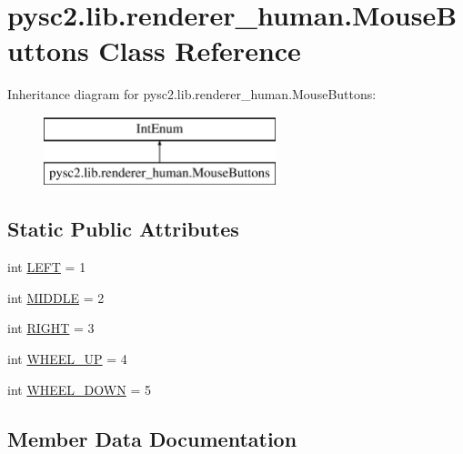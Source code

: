 \hypertarget{classpysc2_1_1lib_1_1renderer__human_1_1_mouse_buttons}{}\section{pysc2.\+lib.\+renderer\+\_\+human.\+Mouse\+Buttons Class Reference}
\label{classpysc2_1_1lib_1_1renderer__human_1_1_mouse_buttons}
Inheritance diagram for pysc2.\+lib.\+renderer\+\_\+human.\+Mouse\+Buttons\+:\begin{figure}[H]
\begin{center}
\leavevmode
\includegraphics[height=2.000000cm]{classpysc2_1_1lib_1_1renderer__human_1_1_mouse_buttons}
\end{center}
\end{figure}
\subsection*{Static Public Attributes}
\begin{DoxyCompactItemize}
\item 
int \mbox{\hyperlink{classpysc2_1_1lib_1_1renderer__human_1_1_mouse_buttons_a924aa043958c06b8f50d2cac8d234fc6}{L\+E\+FT}} = 1
\item 
int \mbox{\hyperlink{classpysc2_1_1lib_1_1renderer__human_1_1_mouse_buttons_a5bdc628bd952045939b1bfd4507f952c}{M\+I\+D\+D\+LE}} = 2
\item 
int \mbox{\hyperlink{classpysc2_1_1lib_1_1renderer__human_1_1_mouse_buttons_af95c965e2c7155f77979dcc124ef7bd3}{R\+I\+G\+HT}} = 3
\item 
int \mbox{\hyperlink{classpysc2_1_1lib_1_1renderer__human_1_1_mouse_buttons_a60db258ef9155fca3d68dc014a4a3ca1}{W\+H\+E\+E\+L\+\_\+\+UP}} = 4
\item 
int \mbox{\hyperlink{classpysc2_1_1lib_1_1renderer__human_1_1_mouse_buttons_a4a6158420c7fc5bb512c09fe8cf9b2f0}{W\+H\+E\+E\+L\+\_\+\+D\+O\+WN}} = 5
\end{DoxyCompactItemize}


\subsection{Member Data Documentation}
\mbox{\label{classpysc2_1_1lib_1_1renderer__human_1_1_mouse_buttons_a924aa043958c06b8f50d2cac8d234fc6}} 
